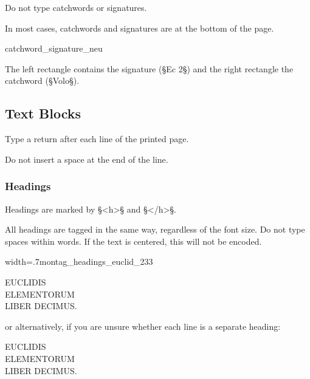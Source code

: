 \begin{mainrule}
Do not type catchwords or signatures.
\end{mainrule}

\begin{clarification}
In most cases, catchwords and signatures are at the bottom of the page.
\end{clarification}

\begin{sampleImage}{catchword_signature_neu}

\notTranscribed

The left rectangle contains the signature (§Ec 2§) and the right rectangle the catchword (§Volo§).
\end{sampleImage}


\tocspace
\subsection{Text Blocks}

\begin{mainrule}
Type a return after each line of the printed page.
\end{mainrule}

\begin{clarification}
Do not insert a space at the end of the line. 
\end{clarification}

\subsubsection{Headings}
\label{section headings}

\begin{mainrule}
Headings are marked by §<h>§ and §</h>§.
\end{mainrule}

\begin{clarification}
All headings are tagged in the same way, regardless of the font size. Do not type spaces within words. If the text is centered, this will not be encoded.
\end{clarification}

\begin{sampleImageSmall}{width=.7\linewidth}{montag_headings_euclid_233}
\begin{typeLatin}
EUCLIDIS \\
ELEMENTORUM \\
LIBER DECIMUS.
\end{typeLatin}
or alternatively, if you are unsure whether each line is a separate heading:
\begin{typeLatin}
EUCLIDIS \\
ELEMENTORUM \\
LIBER DECIMUS.
\end{typeLatin}
\end{sampleImageSmall}


